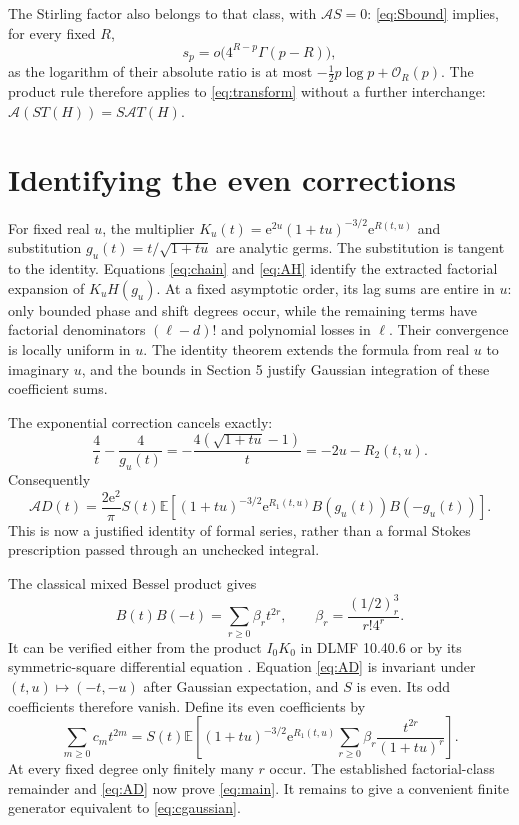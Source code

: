 \documentclass[11pt,letterpaper]{article}
\numberwithin{equation}{section}
\theoremstyle{remark}\newtheorem{remark}[theorem]{Remark}
\newcommand{\E}{\mathbb E}
\newcommand{\e}{\mathrm e}
\newcommand{\Ord}{\mathcal O}
\newcommand{\As}{\mathcal A}
\begin{document}
The Stirling factor also belongs to that class, with $\As S=0$: \eqref{eq:Sbound} implies, for every fixed $R$,
\[
 s_p=o\bigl(4^{R-p}\Gamma(p-R)\bigr),
\]
as the logarithm of their absolute ratio is at most $-\tfrac12p\log p+\Ord_R(p)$. The product rule therefore applies to \eqref{eq:transform} without a further interchange: $\As(S T(H))=S\As T(H)$.

\section{Identifying the even corrections}
For fixed real $u$, the multiplier
$K_u(t)=\e^{2u}(1+tu)^{-3/2}\e^{R(t,u)}$ and substitution
$g_u(t)=t/\sqrt{1+tu}$ are analytic germs. The substitution is tangent to the identity. Equations \eqref{eq:chain} and \eqref{eq:AH} identify the extracted factorial expansion of $K_uH(g_u)$. At a fixed asymptotic order, its lag sums are entire in $u$: only bounded phase and shift degrees occur, while the remaining terms have factorial denominators $(\ell-d)!$ and polynomial losses in $\ell$. Their convergence is locally uniform in $u$. The identity theorem extends the formula from real $u$ to imaginary $u$, and the bounds in Section 5 justify Gaussian integration of these coefficient sums.

The exponential correction cancels exactly:
\[
 \frac4t-\frac4{g_u(t)}=-\frac{4(\sqrt{1+tu}-1)}t=-2u-R_2(t,u).
\]
Consequently
\begin{equation}\label{eq:AD}
 \As D(t)=\frac{2\e^2}{\pi}S(t)
 \E\left[(1+tu)^{-3/2}\e^{R_1(t,u)}
                 B(g_u(t))B(-g_u(t))\right].
\end{equation}
This is now a justified identity of formal series, rather than a formal Stokes prescription passed through an unchecked integral.

The classical mixed Bessel product gives
\begin{equation}\label{eq:mixed}
 B(t)B(-t)=\sum_{r\ge0}\beta_rt^{2r},
 \qquad \beta_r=\frac{(1/2)_r^3}{r!4^r}.
\end{equation}
It can be verified either from the product $I_0K_0$ in DLMF 10.40.6 or by its symmetric-square differential equation \cite{dlmfbessel}. Equation \eqref{eq:AD} is invariant under $(t,u)\mapsto(-t,-u)$ after Gaussian expectation, and $S$ is even. Its odd coefficients therefore vanish. Define its even coefficients by
\begin{equation}\label{eq:cgaussian}
 \sum_{m\ge0}c_mt^{2m}
 =S(t)\E\left[(1+tu)^{-3/2}\e^{R_1(t,u)}
          \sum_{r\ge0}\beta_r\frac{t^{2r}}{(1+tu)^r}\right].
\end{equation}
At every fixed degree only finitely many $r$ occur. The established factorial-class remainder and \eqref{eq:AD} now prove \eqref{eq:main}. It remains to give a convenient finite generator equivalent to \eqref{eq:cgaussian}.
\end{document}
